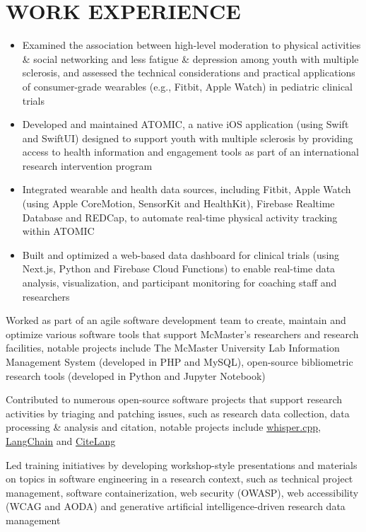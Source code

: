 \documentclass[letterpaper,11pt]{article}%
\newcommand{\resumeItem}[1]{\item\avenir\small{
            #1 \vspace{-1pt}
    }
    }%
\newcommand{\resumeSubHeadingListStart}{\begin{itemize}[leftmargin=0in, label={}]}%
\newcommand{\resumeItemListEnd}{\end{itemize}\vspace{0pt}}%
\begin{document}
\section{WORK EXPERIENCE}%
\label{sec:WORKEXPERIENCE}%
\resumeSubHeadingListStart%
%
\resumeItem{Examined the association between high-level moderation to physical activities \& social networking and less fatigue \& depression among youth with multiple sclerosis, and assessed the technical considerations and practical applications of consumer-grade wearables (e.g., Fitbit, Apple Watch) in pediatric clinical trials}%
\resumeItem{Developed and maintained ATOMIC, a native iOS application (using Swift and SwiftUI) designed to support youth with multiple sclerosis by providing access to health information and engagement tools as part of an international research intervention program}%
\resumeItem{Integrated wearable and health data sources, including Fitbit, Apple Watch (using Apple CoreMotion, SensorKit and HealthKit), Firebase Realtime Database and REDCap, to automate real-time physical activity tracking within ATOMIC}%
\resumeItem{Built and optimized a web-based data dashboard for clinical trials (using Next.js, Python and Firebase Cloud Functions) to enable real-time data analysis, visualization, and participant monitoring for coaching staff and researchers}%
\resumeItemListEnd%
%
\resumeItem{Worked as part of an agile software development team to create, maintain and optimize various software tools that support McMaster's researchers and research facilities, notable projects include The McMaster University Lab Information Management System (developed in PHP and MySQL), open-source bibliometric research tools (developed in Python and Jupyter Notebook)}%
\resumeItem{Contributed to numerous open-source software projects that support research activities by triaging and patching issues, such as research data collection, data processing \& analysis and citation, notable projects include \href{https://github.com/ggerganov/whisper.cpp}{whisper.cpp}, \href{https://github.com/langchain-ai/langchain}{LangChain} and \href{https://github.com/vsoch/citelang}{CiteLang}}%
\resumeItem{Led training initiatives by developing workshop-style presentations and materials on topics in software engineering in a research context, such as technical project management, software containerization, web security (OWASP), web accessibility (WCAG and AODA) and generative artificial intelligence-driven research data management}%
\end{document}
